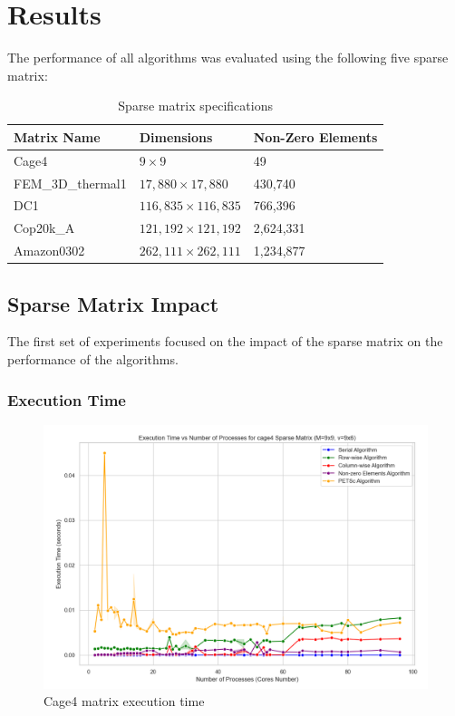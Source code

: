 \documentclass[12pt,oneside]{book} %
\begin{document}
\section{Results}

The performance of all algorithms was evaluated using the following five sparse
matrix:
\begin{table}[h]
    \centering
    \begin{tabular}{|l|l|l|}
        \hline
        \textbf{Matrix Name} & \textbf{Dimensions}        & \textbf{Non-Zero Elements} \\ \hline
        Cage4                & \(9 \times 9\)             & 49                         \\ \hline
        FEM\_3D\_thermal1    & \(17,880 \times 17,880\)   & 430,740                    \\ \hline
        DC1                  & \(116,835 \times 116,835\) & 766,396                    \\ \hline
        Cop20k\_A            & \(121,192 \times 121,192\) & 2,624,331                  \\ \hline
        Amazon0302           & \(262,111 \times 262,111\) & 1,234,877                  \\ \hline
    \end{tabular}
    \caption{Sparse matrix specifications}
    \label{tab:matrix_summary}
\end{table}

\subsection{Sparse Matrix Impact}
The first set of experiments focused on the impact of the sparse matrix on the
performance of the algorithms.
\subsubsection{Execution Time}
\begin{figure}[H]
    \centering
    \includegraphics[width=0.5\linewidth]{../results/matrix_dim/cage4_k6_execution_time.png}
    \caption{Cage4 matrix execution time}\label{fig:cage4-k6-execution-time}
\end{figure}
\end{document}
